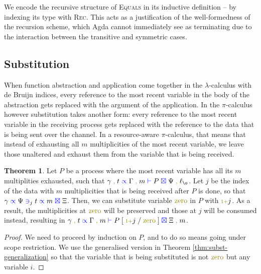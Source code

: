 \documentclass[a4paper,UKenglish,cleveref, autoref, thm-restate,authorcolumns]{lipics-v2019}
\theoremstyle{definition}
\newtheorem{nitheorem}[theorem]{Theorem}
\newcommand{\lambdacalc}{$\lambda$-calculus}
\newcommand{\picalc}{$\pi$-calculus}
\newcommand{\type}[1]{\textcolor{blue}{\operatorname{#1}}}
\newcommand{\constr}[1]{\textcolor{olive}{\operatorname{#1}}}
\newcommand{\suc}{\constr{\scriptstyle 1+}}
\newcommand{\comma}{\; \constr{,} \;}
\newcommand{\subst}[3]{#1 \; [ \; #2 \; / \;#3 \;]}
\newcommand{\lz}{\ell_{\o}}
\newcommand{\types}[4]{#1 \; \type{\propto} \; #2 \; \type{\vdash} \; #3 \; \type{\boxtimes} \; #4}
\newcommand{\contains}[6]{#1 \; \type{\propto} \; #2 \; \type{\ni}_{#3} \; #4 \; \type{\propto} \; #5 \; \type{\boxtimes} \; #6}
\begin{document}
\begin{remark}
  We encode the recursive structure of \textsc{Equals} in its inductive definition -- by indexing its type with \textsc{Rec}.
  This acts as a justification of the well-formedness of the recursion scheme, which Agda cannot immediately see as terminating due to the interaction between the transitive and symmetric cases.
\end{remark}

\subsection{Substitution}
\label{substitution}

When function abstraction and application come together in the \lambdacalc{} with de Bruijn indices, every reference to the most recent variable in the body of the abstraction gets replaced with the argument of the application.
In the \picalc{} however substitution takes another form: every reference to the most recent variable in the receiving process gets replaced with the reference to the data that is being sent over the channel.
In a resource-aware \picalc{}, that means that instead of exhausting all $m$ multiplicities of the most recent variable, we leave those unaltered and exhaust them from the variable that is being received.

\begin{nitheorem}
  \label{thm:substitution}
  Let $P$ be a process where the most recent variable has all its $m$ multiplities exhausted, such that $\types{\gamma \comma t}{\Gamma \comma m}{P}{\Psi \comma \lz}$.
  Let $j$ be the index of the data with $m$ multiplicities that is being received after $P$ is done, so that $\contains{\gamma}{\Psi}{j}{t}{m}{\Xi}$.
  Then, we can substitute variable $\constr{zero}$ in $P$ with $\suc j$.
  As a result, the multiplicities at $\constr{zero}$ will be preserved and those at $j$ will be consumed instead, resulting in $\types{\gamma \comma t}{\Gamma \comma m}{\subst{P}{\suc j}{\constr{zero}}}{\Xi \comma m}$.
\end{nitheorem}
\begin{proof}
  We need to proceed by induction on $P$, and to do so means going under scope restriction.
  We use the generalised version in Theorem \ref{thm:subst-generalization} so that the variable that is being substituted is not $\constr{zero}$ but any variable $i$.
\end{proof}
\end{document}
